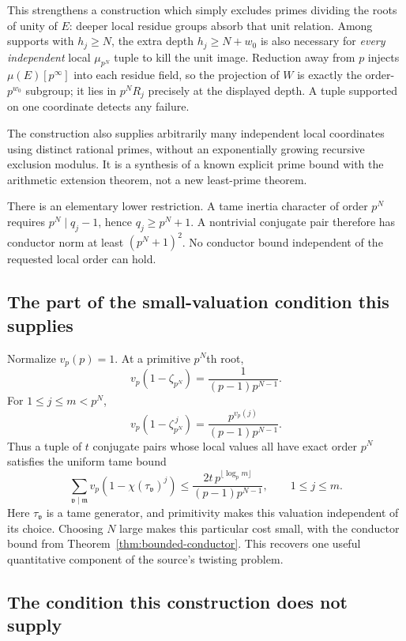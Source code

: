 This strengthens a construction which simply excludes primes dividing the roots of unity of $E$: deeper local residue groups absorb that unit relation. Among supports with $h_j\ge N$, the extra depth $h_j\ge N+w_0$ is also necessary for \emph{every independent} local $\mu_{p^N}$ tuple to kill the unit image. Reduction away from $p$ injects $\mu(E)[p^\infty]$ into each residue field, so the projection of $W$ is exactly the order-$p^{w_0}$ subgroup; it lies in $p^NR_j$ precisely at the displayed depth. A tuple supported on one coordinate detects any failure.

The construction also supplies arbitrarily many independent local coordinates using distinct rational primes, without an exponentially growing recursive exclusion modulus. It is a synthesis of a known explicit prime bound with the arithmetic extension theorem, not a new least-prime theorem.

There is an elementary lower restriction. A tame inertia character of order $p^N$ requires $p^N\mid q_j-1$, hence $q_j\ge p^N+1$. A nontrivial conjugate pair therefore has conductor norm at least $(p^N+1)^2$. No conductor bound independent of the requested local order can hold.

\subsection{The part of the small-valuation condition this supplies}

Normalize $v_p(p)=1$. At a primitive $p^N$th root,
\[
 v_p(1-\zeta_{p^N})=\frac{1}{(p-1)p^{N-1}}.
\]
For $1\le j\le m<p^N$,
\[
 v_p(1-\zeta_{p^N}^{\,j})
     =\frac{p^{v_p(j)}}{(p-1)p^{N-1}}.
\]
Thus a tuple of $t$ conjugate pairs whose local values all have exact order $p^N$ satisfies the uniform tame bound
\[
 \sum_{\mathfrak v\mid\mathfrak m}
 v_p(1-\chi(\tau_{\mathfrak v})^j)
 \le
 \frac{2t\,p^{\lfloor\log_p m\rfloor}}{(p-1)p^{N-1}},
 \qquad 1\le j\le m.
\]
Here $\tau_{\mathfrak v}$ is a tame generator, and primitivity makes this valuation independent of its choice. Choosing $N$ large makes this particular cost small, with the conductor bound from Theorem~\ref{thm:bounded-conductor}. This recovers one useful quantitative component of the source's twisting problem.

\subsection{The condition this construction does not supply}

